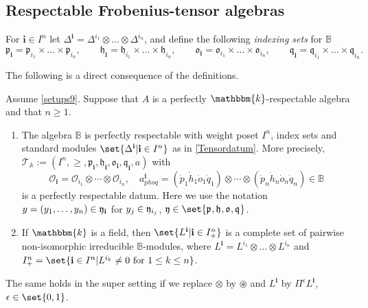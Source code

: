 \documentclass[a4paper,11pt]{amsart}
\newcommand\bi{\mathbf{i}}
\numberwithin{equation}{subsection}
\theoremstyle{definition}
\theoremstyle{theorem}
\theoremstyle{remark}
\newcommand\CO{\mathcal{O}}
\newcommand\plam[1][\lambda]{\mathfrak{p}_{#1}}
\newcommand\hlam[1][\lambda]{\mathfrak{h}_{#1}}
\newcommand\qlam[1][\lambda]{\mathfrak{q}_{#1}}
\newcommand\Olam[1][\lambda]{\CO_{#1}}
\newcommand\olam[1][\lambda]{\mathfrak{o}_{#1}}
\newcommand\kk{\mathbbm{k}}
\newcommand{\Ao}{\mathbb{A}}
\newcommand{\Bo}{\mathbb{B}}
\begin{document}
\subsection{Respectable Frobenius-tensor algebras}

\begin{Definition}\label{Tensordatum}
 For $\bi\in I^n$ let $\Delta^\bi=\Delta^{i_1}\otimes \dots\otimes \Delta^{i_n}$, and define the following \emph{indexing sets} for $\Bo$
  \begin{equation}
        \plam[\bi]=\plam[i_1]\times\dots\times\plam[i_n],\qquad
        \hlam[\bi]=\hlam[i_1]\times\dots\times\hlam[i_n],\qquad
        \olam[\bi]=\olam[i_1]\times\dots\times\olam[i_n],\qquad
        \qlam[\bi]=\qlam[i_1]\times\dots\times\qlam[i_n].
  \end{equation}
   \end{Definition}

The following is a direct consequence of  the definitions.

\begin{Lemma}\label{P:FrobeniusRespect}
   Assume \autoref{setups9}. Suppose that $A$ is a perfectly $\kk$-respectable algebra and that $n\ge1$.
   \begin{enumerate}
  \item  The
   algebra $\Bo$ is  perfectly respectable with  weight poset $I^n$, index sets
   and  standard modules $\set{\Delta^\bi|\bi\in I^n}$ as in \autoref{Tensordatum}. More precisely,
   $\mathcal{T}_\Ao:=(I^n, \ge, \plam[\bi],\hlam[\bi],\olam[\bi],\qlam[\bi],a)$ with \[\Olam[\bi]=\Olam[{i_1}]\otimes\cdots\otimes\Olam[{i_n}],\quad a^\bi_{phoq}=(\dot p_{1}\dot h_{1}\dot o_{1}\dot q_{1})\otimes\cdots\otimes (\dot p_{n}\dot h_{n}\dot o_{n}\dot q_{n})\in\Bo\] is a perfectly respectable datum. Here
   we use the notation $y=(y_1,\ldots, y_n)\in \frak{y}_\bi$ for $y_j\in\frak{y}_{i_j}$, $\frak{y}\in\set{\plam[],\hlam[],\olam[],\qlam[]}$.
   \item If $\kk$ is a field, then $\set{L^\bi|\bi\in I^n_+}$ is a complete
   set of pairwise non-isomorphic irreducible $\Bo$-modules, where $L^\bi=L^{i_1}\otimes\dots\otimes L^{i_n}$ and $I^n_+=\set{\bi\in I^n|L^{i_k}\ne0\text{ for }1\le k\le n}$.
   \end{enumerate}
\end{Lemma}
\begin{Remark}The same holds in the super setting if we replace $\otimes$ by $\circledast$ and $L^\bi$ by $\Pi^\epsilon L^\bi$, $\epsilon\in\set{0,1}$.
\end{Remark}
\end{document}
